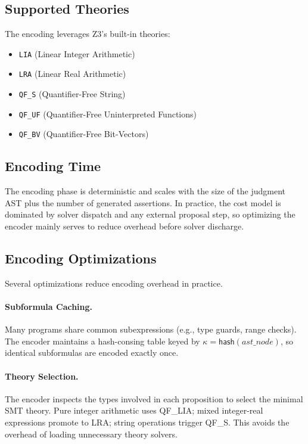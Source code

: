 \documentclass[11pt]{article}
\newcommand{\CacheKey}{\kappa}
\begin{document}
\subsection{Supported Theories}
The encoding leverages Z3's built-in theories:
\begin{itemize}[noitemsep]
  \item \texttt{LIA} (Linear Integer Arithmetic)
  \item \texttt{LRA} (Linear Real Arithmetic)
  \item \texttt{QF\_S} (Quantifier-Free String)
  \item \texttt{QF\_UF} (Quantifier-Free Uninterpreted Functions)
  \item \texttt{QF\_BV} (Quantifier-Free Bit-Vectors)
\end{itemize}

\subsection{Encoding Time}
The encoding phase is deterministic and scales with the size of the
judgment AST plus the number of generated assertions.  In practice, the
cost model is dominated by solver dispatch and any external proposal step,
so optimizing the encoder mainly serves to reduce overhead before solver
discharge.

\subsection{Encoding Optimizations}\label{sec:encoding-opt}

Several optimizations reduce encoding overhead in practice.

\paragraph{Subformula Caching.}
Many programs share common subexpressions (e.g., type guards, range
checks).  The encoder maintains a hash-consing table keyed by
$\CacheKey = \mathsf{hash}(\mathit{ast\_node})$, so identical
subformulas are encoded exactly once.

\paragraph{Theory Selection.}
The encoder inspects the types involved in each proposition to select the
minimal SMT theory.  Pure integer arithmetic uses QF\_LIA; mixed
integer-real expressions promote to LRA; string operations trigger QF\_S.
This avoids the overhead of loading unnecessary theory solvers.
\end{document}
